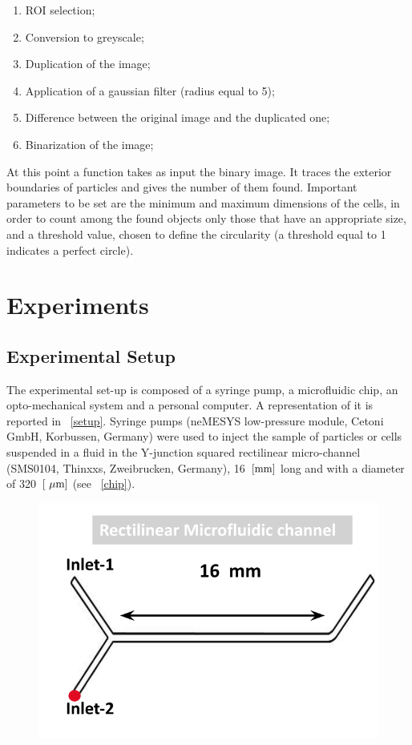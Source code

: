 \documentclass[journal]{IEEEtran}
\theoremstyle{definition}
\theoremstyle{remark}
\begin{document}
 \begin{enumerate}
 	\item ROI selection;
 	\item Conversion to greyscale;
 	\item Duplication of the image;
 	\item Application of a gaussian filter (radius equal to 5);
 	\item Difference between the original image and the duplicated one;
 	\item Binarization of the image;
 \end{enumerate}
At this point a function takes as input the binary image. It traces the exterior boundaries of particles and gives the number of them found.
Important parameters to be set are the minimum and maximum dimensions of the cells, in order to count among the found objects only those that have an appropriate size, and a threshold value, chosen to define the circularity (a threshold equal to 1 indicates a perfect circle).


\section{Experiments}

\subsection{Experimental Setup}

The experimental set-up is composed of a syringe pump, a microfluidic chip, an opto-mechanical system and a personal computer. A representation of it is reported in ~\fig\ref{setup}. Syringe pumps (neMESYS low-pressure module, Cetoni GmbH,
Korbussen, Germany) were used to inject the sample of particles or cells suspended in a fluid in the Y-junction squared rectilinear micro-channel (SMS0104, Thinxxs, Zweibrucken, Germany), 16~$[\rm mm]$ long and with a diameter of 320~$[\rm~\mu m]$ (see ~\fig\ref{chip}).

\begin{figure}[h]
	\centering
	\includegraphics[width=0.5\columnwidth]{images/chip}
\end{figure}
\end{document}
